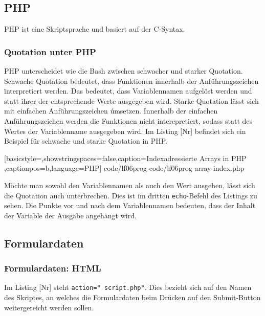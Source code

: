 \subsection{PHP}

PHP ist eine Skriptsprache und basiert auf der C-Syntax.

\subsubsection{Quotation unter PHP}

PHP unterscheidet wie die Bash zwischen schwacher und starker Quotation. Schwache Quotation bedeutet, dass Funktionen innerhalb der Anführungszeichen \" interpretiert werden. Das bedeutet, dass Variablennamen aufgelöst werden und statt ihrer der entsprechende Werte ausgegeben wird. Starke Quotation lässt sich mit einfachen Anführungszeichen \' umsetzen. Innerhalb der einfachen Anführungszeichen werden die Funktionen nicht interepretiert, sodass statt des Wertes der Variablenname ausgegeben wird. Im Listing [Nr] befindet sich ein Beispiel für schwache und starke Quotation in PHP.


	[basicstyle=\small,showstringspaces=false,caption={Indexadressierte Arrays in PHP}
	\label{lst:array-index},captionpos=b,language=PHP]
	{code/lf06prog-code/lf06prog-array-index.php}
	
Möchte man sowohl den Variablennamen als auch den Wert ausgeben, lässt sich die Quotation auch unterbrechen. Dies ist im dritten \texttt{echo}-Befehl des Listings zu sehen. Die Punkte vor und nach dem Variablennamen bedeuten, dass der Inhalt der Variable der Ausgabe angehängt wird.


\subsection{Formulardaten}

\subsubsection{Formulardaten: HTML}

Im Listing [Nr] steht \texttt{action="\ script.php"}. Dies bezieht sich auf den Namen des Skriptes, an welches die Formulardaten beim Drücken auf den Submit-Button weitergereicht werden sollen.

